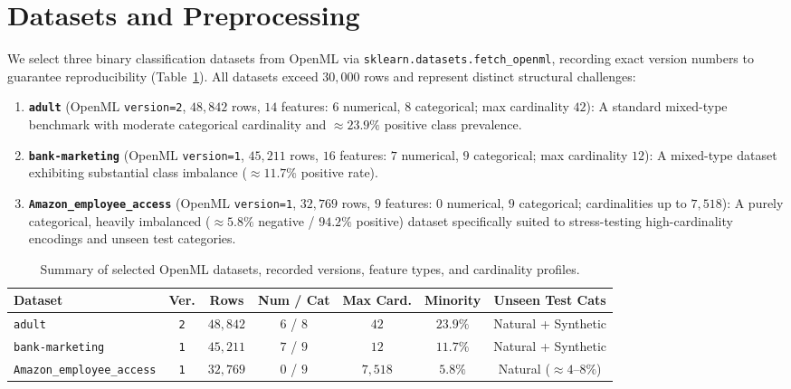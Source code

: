 \documentclass[twoside,11pt]{article}
\begin{document}
\section{Datasets and Preprocessing}
We select three binary classification datasets from OpenML via \texttt{sklearn.datasets.fetch\_openml}, recording exact version numbers to guarantee reproducibility (Table~\ref{tab:datasets}). All datasets exceed $30{,}000$ rows and represent distinct structural challenges:
\begin{enumerate}[leftmargin=*, nosep, topsep=2pt]
    \item \textbf{\texttt{adult}} (OpenML \texttt{version=2}, $48{,}842$ rows, $14$ features: $6$ numerical, $8$ categorical; max cardinality $42$): A standard mixed-type benchmark with moderate categorical cardinality and $\approx 23.9\%$ positive class prevalence.
    \item \textbf{\texttt{bank-marketing}} (OpenML \texttt{version=1}, $45{,}211$ rows, $16$ features: $7$ numerical, $9$ categorical; max cardinality $12$): A mixed-type dataset exhibiting substantial class imbalance ($\approx 11.7\%$ positive rate).
    \item \textbf{\texttt{Amazon\_employee\_access}} (OpenML \texttt{version=1}, $32{,}769$ rows, $9$ features: $0$ numerical, $9$ categorical; cardinalities up to $7{,}518$): A purely categorical, heavily imbalanced ($\approx 5.8\%$ negative / $94.2\%$ positive) dataset specifically suited to stress-testing high-cardinality encodings and unseen test categories.
\end{enumerate}

\begin{table}[t]
\centering
\footnotesize
\setlength{\tabcolsep}{4.5pt}
\caption{Summary of selected OpenML datasets, recorded versions, feature types, and cardinality profiles.}
\label{tab:datasets}
\begin{tabular*}{\textwidth}{@{\extracolsep{\fill}}lcccccc@{}}
\toprule
\textbf{Dataset} & \textbf{Ver.} & \textbf{Rows} & \textbf{Num / Cat} & \textbf{Max Card.} & \textbf{Minority} & \textbf{Unseen Test Cats} \\
\midrule
\texttt{adult} & \texttt{2} & $48{,}842$ & $6$ / $8$ & $42$ & $23.9\%$ & Natural + Synthetic \\
\texttt{bank-marketing} & \texttt{1} & $45{,}211$ & $7$ / $9$ & $12$ & $11.7\%$ & Natural + Synthetic \\
\texttt{Amazon\_employee\_access} & \texttt{1} & $32{,}769$ & $0$ / $9$ & $7{,}518$ & $5.8\%$ & Natural ($\approx 4$--$8\%$) \\
\bottomrule
\end{tabular*}
\end{table}
\end{document}
